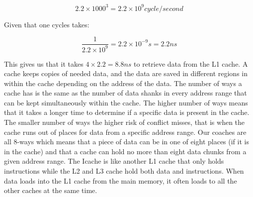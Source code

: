 $$ 2.2 \times 1000^3 = 2.2 \times 10^9 cycle / second$$

Given that one cycles takes:

$$ \frac{1}{2.2 \times 10^9 } = 2.2 \times 10^{-9}s = 2.2ns$$

This gives us that it takes $4 \times 2.2 = 8.8ns$ to retrieve data from the L1 cache. A
cache keeps copies of needed data, and the data are saved in different regions in
within the cache depending on the address of the data. The number of ways a cache has
is the same as the number of data shanks in every address range that can be kept simultaneously
within the cache. The higher number of ways means that it takes a longer time to determine
if a specific data is present in the cache. The smaller number of ways the higher risk of conflict misses, that is when the cache runs out of places for data from a specific
address range. Our coaches are all 8-ways which means that a piece of data can be
in one of eight places (if it is in the cache) and that a cache can hold no more than
eight data chunks from a given address range. The Icache is like another L1 cache
that only holds instructions while the L2 and L3 cache hold both data and instructions.
When data loads into the L1 cache from the main memory, it often loads
to all the other caches at the same time.


